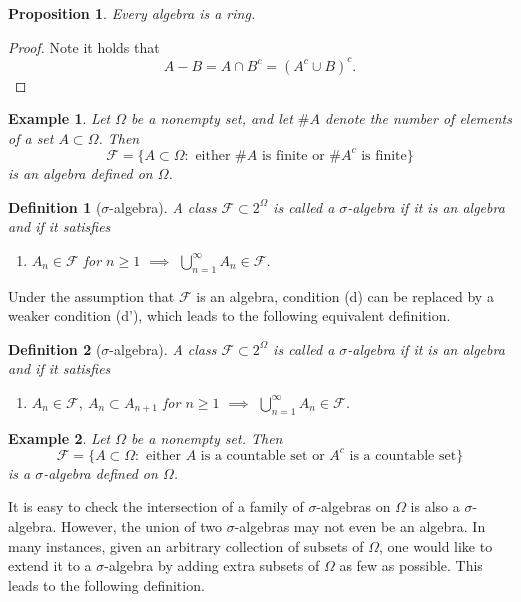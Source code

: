 \documentclass{report}
\newtheorem{definition}{Definition}[section]
\newtheorem{example}{Example}[section]
\newtheorem{proposition}{Proposition}[section]
\theoremstyle{nonumberplain}
\newtheorem{proof}{Proof.}
\begin{document}
\begin{proposition}
	Every algebra is a ring.
\end{proposition}
\begin{proof}
	Note it holds that 
	\[
	A-B=A\cap B^c=(A^c\cup B)^c.
	\]
\end{proof}

\begin{example}
	Let $\Omega$ be a nonempty set, and let $\#A$ denote the number of elements of a set $A\subset\Omega$. Then
	\[
	\mathcal{F} = \{A\subset \Omega : \text{ either }\#A\text{ is finite or }\#A^c\text{ is finite}\}
	\]
	is an algebra defined on $\Omega$.
\end{example}

\begin{definition}[$\sigma$-algebra]
A class $\mathcal{F}\subset 2^{\Omega}$ is called a \emph{$\sigma$-algebra} if it is an algebra and if it satisfies
\begin{enumerate}
	\item [(d)] $A_n\in\mathcal{F}$ for $n\ge 1$ $\implies$ $\bigcup\limits_{n=1}^\infty A_n\in\mathcal{F}$.
\end{enumerate}
\end{definition}
Under the assumption that $\mathcal{F}$ is an algebra, condition (d) can be replaced by a weaker condition (d'), which leads to the following equivalent definition.

\begin{definition}[$\sigma$-algebra]
	A class $\mathcal{F}\subset 2^{\Omega}$ is called a \emph{$\sigma$-algebra} if it is an algebra and if it satisfies
	\begin{enumerate}
		\item [(d')] $A_n\in\mathcal{F},\ A_n\subset A_{n+1}$ for $n\ge 1$ $\implies$ $\bigcup\limits_{n=1}^\infty A_n\in\mathcal{F}$.
	\end{enumerate}
\end{definition}

\begin{example}
	Let $\Omega$ be a nonempty set. Then
	\[
	\mathcal{F} = \{A\subset \Omega : \text{ either }A\text{ is a countable set or }A^c\text{ is a countable set}\}
	\]
	is a $\sigma$-algebra defined on $\Omega$.
\end{example}
It is easy to check the intersection of a family of $\sigma$-algebras on $\Omega$ is also a $\sigma$-algebra. However, the union of two $\sigma$-algebras may not even be an algebra. In many instances, given an arbitrary collection of subsets of $\Omega$, one would like to extend it to a $\sigma$-algebra by adding extra subsets of $\Omega$ as few as possible. This leads to the following definition.
\end{document}
